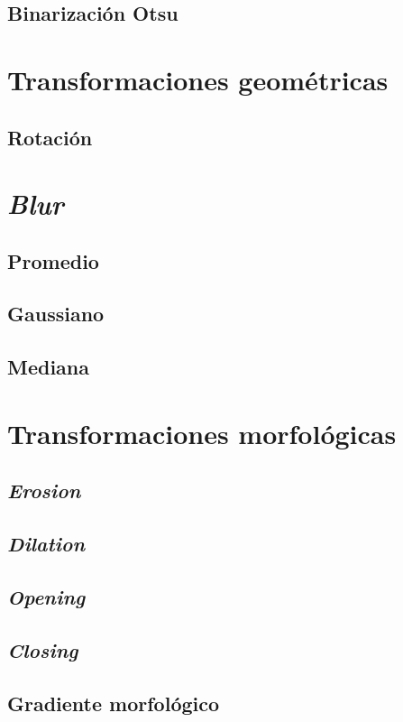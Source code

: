 \subsection{Binarización Otsu}

\section{Transformaciones geométricas}
\subsection{Rotación}

\section{\emph{Blur}}
\subsection{Promedio}
\subsection{Gaussiano}
\subsection{Mediana}

\section{Transformaciones morfológicas}
\subsection{\emph{Erosion}}
\subsection{\emph{Dilation}}
\subsection{\emph{Opening}}
\subsection{\emph{Closing}}
\subsection{Gradiente morfológico}

